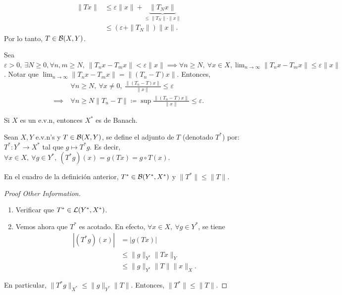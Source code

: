 \begin{align*}
	\| T x \| &\leq \varepsilon \| x \| + \underbrace{\| T_{N} x \|}_{\leq \| T_{N} \| \cdot \| x \|} \\
	&\leq (\varepsilon + \| T_{N} \|) \| x \|
.\end{align*}
Por lo tanto, $T \in \mathcal{B}(X,Y)$. \par
Sea $\varepsilon > 0,\ \exists N \geq 0, \forall n,m \geq N,\ \|T_{n} x - T_{m} x \| < \varepsilon \| x \| \implies \forall n \geq N,\ \forall x \in X, \lim_{n \to \infty} \| T_{n} x - T_{m} x \| \leq \varepsilon \| x \|$. Notar que $\lim_{n \to \infty} \| T_{n} x - T_{m} x \| = \| (T_{n} - T) x \|$. Entonces,
\begin{align*}
	&\forall n \geq N,\ \forall x \neq 0,\ \frac{\| (T_{n} - T) x \|}{\| x \|} \leq \varepsilon \\
	\implies \ &\forall n \geq N \| T_{n} - T \| \coloneq \sup \frac{\| (T_{n} - T) x \|}{\| x \|} \leq \varepsilon
.\end{align*}

\begin{eg}
	Si $X$ es un e.v.n, entonces $X^{*}$ es de Banach.
\end{eg}

\begin{definition}[adjunto de $T$]
	Sean $X,Y$ e.v.n's y $T \in \mathcal{B}(X,Y)$, se define el adjunto de $T$ (denotado $T^{*}$) por: $T^{*} \colon Y^{*} \to X^{*}$ tal que $g \mapsto T^{*} g$. Es decir, $\forall x \in X,\ \forall g \in Y^{*},\ (T^{*} g)(x) = g(T x) = g \circ T(x)$.
\end{definition}

\begin{prop}
	En el cuadro de la definición anterior, $T^{*} \in \mathcal{B}(Y^{*},X^{*})$ y $\| T^{*} \| \leq \| T \|$.
\end{prop}
\begin{proof}[Proof Other Information]
	\begin{enumerate}
		\item Verificar que $T^{*} \in \mathcal{L}(Y^{*},X^{*})$.

		\item Vemos ahora que $T^{*}$ es acotado. En efecto, $\forall x \in X,\ \forall g \in Y^{*}$, se tiene
		\begin{align*}
			|(T^{*} g)(x)| &= |g(T x)| \\
			&\leq \| g \|_{Y^{*}} \| T x \|_{Y} \\
			&\leq \| g \|_{Y^{*}} \| T \| \| x \|_{X}
		.\end{align*}
	\end{enumerate}
	En particular, $\| T^{*} g \|_{X^{*}} \leq \| g \|_{Y^{*}} \| T \|$. Entonces, $\| T^{*} \| \leq \| T \|$.
\end{proof}


